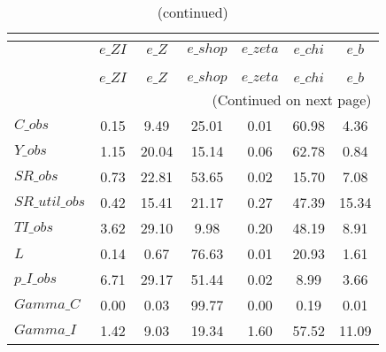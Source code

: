  
\begin{center}
\begin{longtable}{lcccccc} 
\caption{VARIANCE DECOMPOSITION (in percent)}\\
 \label{Table:th_var_decomp_uncond}\\
\toprule 
$               $	 & 	 $     e\_ZI$	 & 	 $      e\_Z$	 & 	 $   e\_shop$	 & 	 $   e\_zeta$	 & 	 $    e\_chi$	 & 	 $      e\_b$\\
\midrule \endfirsthead 
\caption{(continued)}\\
 \toprule \\ 
$               $	 & 	 $     e\_ZI$	 & 	 $      e\_Z$	 & 	 $   e\_shop$	 & 	 $   e\_zeta$	 & 	 $    e\_chi$	 & 	 $      e\_b$\\
\midrule \endhead 
\midrule \multicolumn{7}{r}{(Continued on next page)} \\ \bottomrule \endfoot 
\bottomrule \endlastfoot 
$C\_obs         $	 & 	       0.15	 & 	       9.49	 & 	      25.01	 & 	       0.01	 & 	      60.98	 & 	       4.36 \\ 
$Y\_obs         $	 & 	       1.15	 & 	      20.04	 & 	      15.14	 & 	       0.06	 & 	      62.78	 & 	       0.84 \\ 
$SR\_obs        $	 & 	       0.73	 & 	      22.81	 & 	      53.65	 & 	       0.02	 & 	      15.70	 & 	       7.08 \\ 
$SR\_util\_obs  $	 & 	       0.42	 & 	      15.41	 & 	      21.17	 & 	       0.27	 & 	      47.39	 & 	      15.34 \\ 
$TI\_obs        $	 & 	       3.62	 & 	      29.10	 & 	       9.98	 & 	       0.20	 & 	      48.19	 & 	       8.91 \\ 
$L              $	 & 	       0.14	 & 	       0.67	 & 	      76.63	 & 	       0.01	 & 	      20.93	 & 	       1.61 \\ 
$p\_I\_obs      $	 & 	       6.71	 & 	      29.17	 & 	      51.44	 & 	       0.02	 & 	       8.99	 & 	       3.66 \\ 
$Gamma\_C       $	 & 	       0.00	 & 	       0.03	 & 	      99.77	 & 	       0.00	 & 	       0.19	 & 	       0.01 \\ 
$Gamma\_I       $	 & 	       1.42	 & 	       9.03	 & 	      19.34	 & 	       1.60	 & 	      57.52	 & 	      11.09 \\ 
\end{longtable}
 \end{center}
